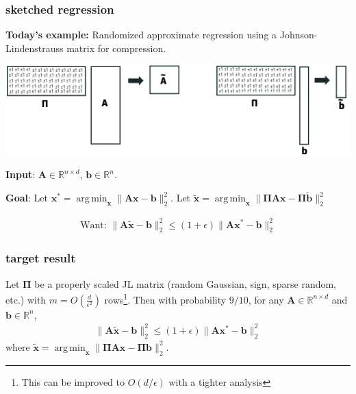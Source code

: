 \documentclass[compress]{beamer}
\newcommand{\bs}[1]{\boldsymbol{#1}}
\newcommand{\bv}[1]{\mathbf{#1}}
\newcommand{\R}{\mathbb{R}}
\DeclareMathOperator*{\argmin}{arg\,min}
\begin{document}
\begin{frame}[t]
	\frametitle{sketched regression}
	\textbf{Today's example:} Randomized approximate regression using a Johnson-Lindenstrauss matrix for compression.
	\begin{center}
		\includegraphics[width=\textwidth]{jlRegression.png}
	\end{center}
		\vspace{-.5em}

	\textbf{Input}: $\bv{A} \in \R^{n\times d}$, $\bv{b} \in \R^{n}$. 
	
	\textbf{Goal}: Let $\bv{x}^* = \argmin_{\bv{x}}\|\bv{A}\bv{x} - \bv{b}\|_2^2$. Let $\tilde{\bv{x}} = \argmin_{\bv{x}}\|\bs{\Pi}{\bv{A}}\bv{x} - \bs{\Pi}\tilde{\bv{b}}\|_2^2$
	
\vspace{-2em}
	\begin{center}	
	\begin{align*}
		\text{Want: }\|\bv{A}\tilde{\bv{x}} - \bv{b}\|_2^2 \leq \left(1+\epsilon\right) \|\bv{A}\bv{x}^* - \bv{b}\|_2^2
 	\end{align*}

\end{center}
\end{frame}

\begin{frame}[t]
\frametitle{target result}
\begin{theorem}
	Let $\bs{\Pi}$ be a properly scaled JL matrix (random Gaussian, sign, sparse random, etc.) with $m = O\left(\frac{d}{\epsilon^2}\right)$ rows\footnote{This can be improved to $O(d/\epsilon)$ with a tighter analysis}. Then with probability $9/10$, for any $\bv{A}\in \R^{n\times d}$ and $\bv{b}\in \R^n$,
	\begin{align*}
		\|\bv{A}\tilde{\bv{x}} - \bv{b}\|_2^2 \leq (1+\epsilon) \|\bv{A}\bv{x}^* - \bv{b}\|_2^2
	\end{align*}
	where $\tilde{\bv{x}} = \argmin_{\bv{x}} \|\bs{\Pi}\bv{A}\bv{x} - \bs{\Pi}\bv{b}\|_2^2$.
\end{theorem}
\end{frame}
\end{document}
